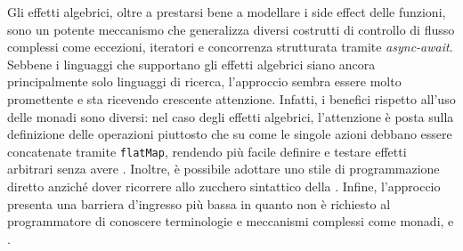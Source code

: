 Gli effetti algebrici, oltre a prestarsi bene a modellare i side effect delle funzioni, sono un potente meccanismo che generalizza diversi costrutti di controllo di flusso complessi come eccezioni, iteratori e concorrenza strutturata tramite \emph{async-await}.
Sebbene i linguaggi che supportano gli effetti algebrici siano ancora principalmente solo linguaggi di ricerca, l'approccio sembra essere molto promettente e sta ricevendo crescente attenzione.
Infatti, i benefici rispetto all'uso delle monadi sono diversi: nel caso degli effetti algebrici, l'attenzione è posta sulla definizione delle operazioni piuttosto che su come le singole azioni debbano essere concatenate tramite \lstinline{flatMap}, rendendo più facile definire e testare effetti arbitrari senza avere .
Inoltre, è possibile adottare uno stile di programmazione diretto anziché dover ricorrere allo zucchero sintattico della .
Infine, l'approccio presenta una barriera d'ingresso più bassa in quanto non è richiesto al programmatore di conoscere terminologie e meccanismi complessi come monadi,  e .
